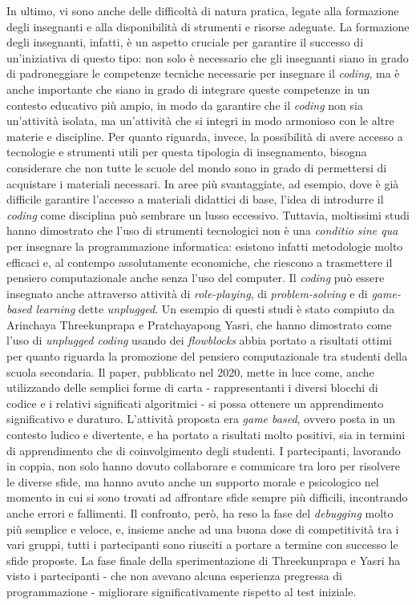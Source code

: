 In ultimo, vi sono anche delle difficoltà di natura pratica, legate alla formazione degli insegnanti e alla disponibilità di strumenti e risorse adeguate.
La formazione degli insegnanti, infatti, è un aspetto cruciale per garantire il successo di un'iniziativa di questo tipo: non solo è necessario che gli insegnanti siano in grado di padroneggiare
le competenze tecniche necessarie per insegnare il \textit{coding}, ma è anche importante che siano in grado di integrare queste competenze in un contesto educativo più ampio,
in modo da garantire che il \textit{coding} non sia un'attività isolata, ma un'attività che si integri in modo armonioso con le altre materie e discipline.
Per quanto riguarda, invece, la possibilità di avere accesso a tecnologie e strumenti utili per questa tipologia di insegnamento, bisogna considerare che non tutte le scuole
del mondo sono in grado di permettersi di acquistare i materiali necessari. In aree più svantaggiate, ad esempio, dove è già difficile garantire l'accesso a materiali didattici di base,
l'idea di introdurre il \textit{coding} come disciplina può sembrare un lusso eccessivo. Tuttavia, moltissimi studi hanno dimostrato che l'uso di strumenti tecnologici non è una 
\textit{conditio sine qua} per insegnare la programmazione informatica: esistono infatti metodologie molto efficaci e, al contempo assolutamente economiche, che riescono a trasmettere il pensiero computazionale
anche senza l'uso del computer. Il \textit{coding} può essere insegnato anche attraverso attività di \textit{role-playing}, di \textit{problem-solving} e di \textit{game-based learning} dette \textit{unplugged}. 
Un esempio di questi studi è stato compiuto da Arinchaya Threekunprapa e Pratchayapong Yasri, che hanno dimostrato come l'uso di \textit{unplugged coding} usando dei \textit{flowblocks} abbia portato a risultati
ottimi per quanto riguarda la promozione del pensiero computazionale tra studenti della scuola secondaria. Il paper, pubblicato nel 2020, mette in luce come, anche utilizzando delle semplici
forme di carta - rappresentanti i diversi blocchi di codice e i relativi significati algoritmici - si possa ottenere un apprendimento significativo e duraturo. L'attività proposta era \textit{game based}, ovvero
posta in un contesto ludico e divertente, e ha portato a risultati molto positivi, sia in termini di apprendimento che di coinvolgimento degli studenti. I partecipanti, lavorando in coppia, 
non solo hanno dovuto collaborare e comunicare tra loro per risolvere le diverse sfide, ma hanno avuto anche un supporto morale e psicologico nel momento in cui si sono trovati ad affrontare 
sfide sempre più difficili, incontrando anche errori e fallimenti. Il confronto, però, ha reso la fase del \textit{debugging} molto più semplice e veloce, e, insieme anche ad una buona dose di competitività
tra i vari gruppi, tutti i partecipanti sono riusciti a portare a termine con successo le sfide proposte. La fase finale della sperimentazione di Threekunprapa e Yasri ha visto i partecipanti - che non 
avevano alcuna esperienza pregressa di programmazione - migliorare significativamente rispetto al test iniziale.


